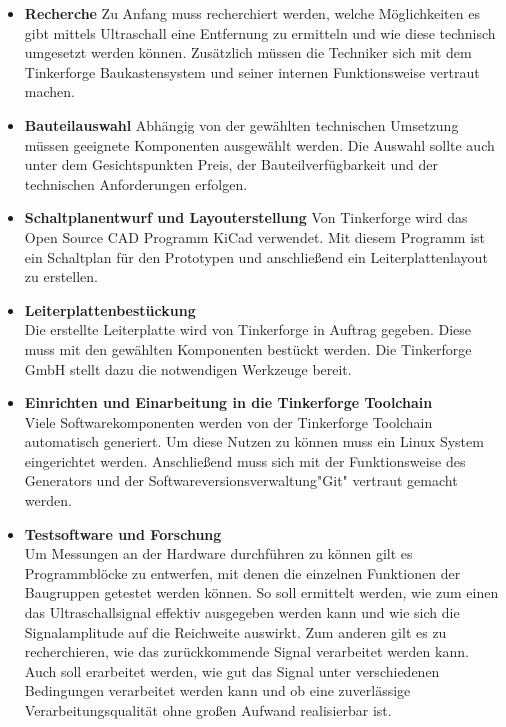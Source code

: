 \begin{itemize}
\item \textbf{Recherche}\newline
Zu  Anfang  muss  recherchiert  werden,  welche  Möglichkeiten  es  gibt  mittels  Ultraschall eine Entfernung zu ermitteln und wie diese technisch umgesetzt werden können. Zusätzlich müssen die Techniker sich mit dem Tinkerforge Baukastensystem und seiner internen Funktionsweise vertraut machen.
\item \textbf{Bauteilauswahl}\newline
Abhängig  von  der  gewählten  technischen  Umsetzung  müssen  geeignete  Komponenten ausgewählt werden. Die Auswahl sollte auch unter dem Gesichtspunkten Preis, der Bauteilverfügbarkeit und der technischen Anforderungen erfolgen.\\
\item \textbf{Schaltplanentwurf und Layouterstellung}\newline
Von  Tinkerforge  wird  das  Open  Source  CAD  Programm  KiCad  verwendet.  Mit diesem Programm ist ein Schaltplan für den Prototypen und anschließend ein Leiterplattenlayout zu erstellen.
\item \textbf{Leiterplattenbestückung}\\
Die erstellte Leiterplatte wird von Tinkerforge in Auftrag gegeben. Diese muss mit den gewählten Komponenten bestückt werden. Die Tinkerforge GmbH stellt dazu die notwendigen Werkzeuge bereit.
\item \textbf{Einrichten und Einarbeitung in die Tinkerforge Toolchain}\\
Viele  Softwarekomponenten  werden  von  der  Tinkerforge  Toolchain  automatisch generiert. Um diese Nutzen zu können muss ein Linux System %
eingerichtet werden. Anschließend muss sich mit der Funktionsweise des Generators und der Softwareversionsverwaltung"Git" vertraut gemacht werden.
\item \textbf{Testsoftware und Forschung}\\
Um Messungen an der Hardware durchführen zu können gilt es Programmblöcke zu entwerfen, mit denen die einzelnen Funktionen der Baugruppen getestet werden können. So soll ermittelt werden, wie zum einen das Ultraschallsignal effektiv ausgegeben werden kann und wie sich die Signalamplitude auf die Reichweite auswirkt. Zum anderen gilt es zu recherchieren, wie das zurückkommende Signal verarbeitet werden kann. Auch soll erarbeitet werden, wie gut das Signal unter verschiedenen Bedingungen verarbeitet werden kann und ob eine zuverlässige Verarbeitungsqualität ohne großen Aufwand realisierbar ist.
\end{itemize}